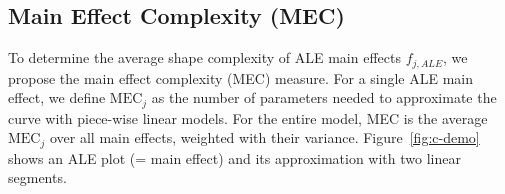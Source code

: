 \documentclass[runningheads]{llncs}\usepackage[]{graphicx}\usepackage[]{color}
\newcommand{\fzero}{f_0}                                              %
\newcommand{\falej}{f_{j,ALE}}                                        %
\begin{document}






\subsection{Main Effect Complexity (MEC)}
\label{sec:curve}


To determine the average shape complexity of ALE main effects $\falej$, we propose the main effect complexity (MEC) measure.
For a single ALE main effect, we define $\text{MEC}_j$ as the number of parameters needed to approximate the curve with piece-wise linear models.
For the entire model, MEC is the average $\text{MEC}_j$ over all main effects, weighted with their variance.
Figure~\ref{fig:c-demo} shows an ALE plot (= main effect) and its approximation with two linear segments.
%

%

%
%
\end{document}
